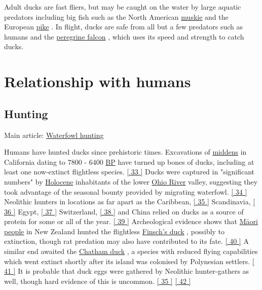 \documentclass[11pt,a4paper]{article}
\begin{document}
Adult ducks are fast fliers, but may be caught on the water by large aquatic predators including big fish such as the North American \href{/wiki/Muskellunge}{muskie} and the European \href{/wiki/Esox}{pike} . In flight, ducks are safe from all but a few predators such as humans and the \href{/wiki/Peregrine\_falcon}{peregrine falcon} , which uses its speed and strength to catch ducks.

\section{Relationship with humans}

\subsection{Hunting}

Main article: \href{/wiki/Waterfowl\_hunting}{Waterfowl hunting}

Humans have hunted ducks since prehistoric times. Excavations of \href{/wiki/Midden}{middens} in California dating to 7800 - 6400 \href{/wiki/Before\_present}{BP} have turned up bones of ducks, including at least one now-extinct flightless species. \href{\#cite\_note-FOOTNOTEErlandson1994171-33}{[ 33 ]} Ducks were captured in "significant numbers" by \href{/wiki/Holocene}{Holocene} inhabitants of the lower \href{/wiki/Ohio\_River}{Ohio River} valley, suggesting they took advantage of the seasonal bounty provided by migrating waterfowl. \href{\#cite\_note-FOOTNOTEJeffries2008168,\_243-34}{[ 34 ]} Neolithic hunters in locations as far apart as the Caribbean, \href{\#cite\_note-FOOTNOTESued-Badillo200365-35}{[ 35 ]} Scandinavia, \href{\#cite\_note-FOOTNOTEThorpe199668-36}{[ 36 ]} Egypt, \href{\#cite\_note-FOOTNOTEMaisels199942-37}{[ 37 ]} Switzerland, \href{\#cite\_note-FOOTNOTERau1876133-38}{[ 38 ]} and China relied on ducks as a source of protein for some or all of the year. \href{\#cite\_note-FOOTNOTEHigman201223-39}{[ 39 ]} Archeological evidence shows that \href{/wiki/M\%C4\%81ori\_people}{Māori people} in New Zealand hunted the flightless \href{/wiki/Finsch\%27s\_duck}{Finsch's duck} , possibly to extinction, though rat predation may also have contributed to its fate. \href{\#cite\_note-FOOTNOTEHume201253-40}{[ 40 ]} A similar end awaited the \href{/wiki/Chatham\_duck}{Chatham duck} , a species with reduced flying capabilities which went extinct shortly after its island was colonised by Polynesian settlers. \href{\#cite\_note-FOOTNOTEHume201252-41}{[ 41 ]} It is probable that duck eggs were gathered by Neolithic hunter-gathers as well, though hard evidence of this is uncommon. \href{\#cite\_note-FOOTNOTESued-Badillo200365-35}{[ 35 ]} \href{\#cite\_note-FOOTNOTEFieldhouse2002167-42}{[ 42 ]}
\end{document}
